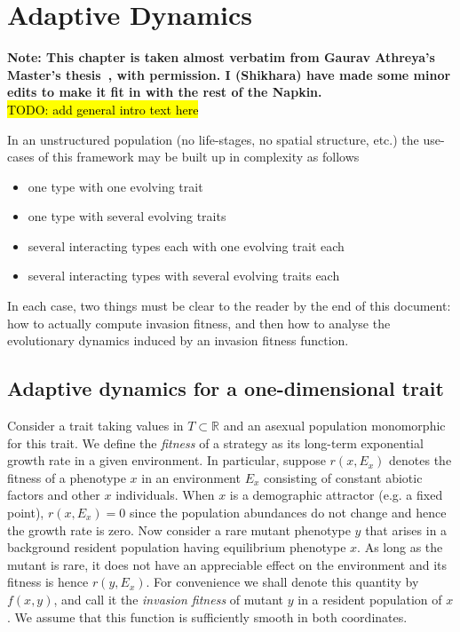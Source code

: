 

\chapter{Adaptive Dynamics}

\textbf{Note: This chapter is taken almost verbatim from Gaurav Athreya's Master's thesis~\citep{athreya_thesis_2023}, with permission. I (Shikhara) have made some minor edits to make it fit in with the rest of the Napkin.}
\\

{\color{red}\hl{TODO: add general intro text here}}

In an unstructured population (no life-stages, no spatial structure, etc.) the use-cases of this framework may be built up in complexity as follows
\begin{itemize} \itemsep -1mm
	\item one type with one evolving trait
	\item one type with several evolving traits
	\item several interacting types each with one evolving trait each
	\item several interacting types with several evolving traits each
\end{itemize}  

In each case, two things must be clear to the reader by the end of this document: how to actually compute invasion fitness, and then how to analyse the evolutionary dynamics induced by an invasion fitness function. 

\section{Adaptive dynamics for a one-dimensional trait}
\label{section:1-dim-AD}

Consider a trait taking values in $T \subset \mathbb{R}$ and an asexual population monomorphic for this trait. We define the \emph{fitness} of a strategy as its long-term exponential growth rate in a given environment. 
In particular, suppose $r(x, E_x)$ denotes the fitness of a phenotype $x$ in an environment $E_x$ consisting of constant abiotic factors and other $x$ individuals.
When $x$ is a demographic attractor (e.g. a fixed point), $r(x, E_x) = 0$ since the population abundances do not change and hence the growth rate is zero. 
Now consider a rare mutant phenotype $y$ that arises in a background resident population having equilibrium phenotype $x$.  
As long as the mutant is rare, it does not have an appreciable effect on the environment and its fitness is hence $r(y, E_x)$. 
For convenience we shall denote this quantity by $f(x,y)$, and call it the \textit{invasion fitness} of mutant $y$ in a resident population of $x$. 
We assume that this function is sufficiently smooth in both coordinates. 

